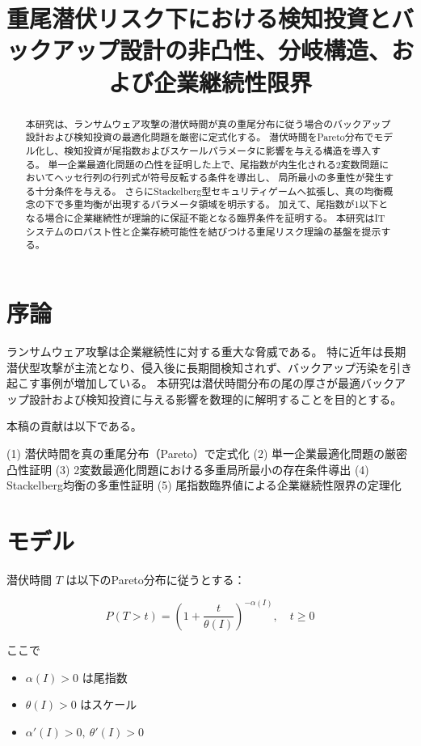 \documentclass[12pt,a4paper]{article}
\title{重尾潜伏リスク下における検知投資とバックアップ設計の非凸性、分岐構造、および企業継続性限界}
\author{}
\date{}
\begin{document}
\maketitle

\begin{abstract}
本研究は、ランサムウェア攻撃の潜伏時間が真の重尾分布に従う場合のバックアップ設計および検知投資の最適化問題を厳密に定式化する。
潜伏時間をPareto分布でモデル化し、検知投資が尾指数およびスケールパラメータに影響を与える構造を導入する。
単一企業最適化問題の凸性を証明した上で、尾指数が内生化される2変数問題においてヘッセ行列の行列式が符号反転する条件を導出し、
局所最小の多重性が発生する十分条件を与える。
さらにStackelberg型セキュリティゲームへ拡張し、真の均衡概念の下で多重均衡が出現するパラメータ領域を明示する。
加えて、尾指数が1以下となる場合に企業継続性が理論的に保証不能となる臨界条件を証明する。
本研究はITシステムのロバスト性と企業存続可能性を結びつける重尾リスク理論の基盤を提示する。
\end{abstract}

\section{序論}

ランサムウェア攻撃は企業継続性に対する重大な脅威である。
特に近年は長期潜伏型攻撃が主流となり、侵入後に長期間検知されず、バックアップ汚染を引き起こす事例が増加している。
本研究は潜伏時間分布の尾の厚さが最適バックアップ設計および検知投資に与える影響を数理的に解明することを目的とする。

本稿の貢献は以下である。

(1) 潜伏時間を真の重尾分布（Pareto）で定式化  
(2) 単一企業最適化問題の厳密凸性証明  
(3) 2変数最適化問題における多重局所最小の存在条件導出  
(4) Stackelberg均衡の多重性証明  
(5) 尾指数臨界値による企業継続性限界の定理化  

\section{モデル}

潜伏時間 $T$ は以下のPareto分布に従うとする：

\begin{equation}
P(T>t)=\left(1+\frac{t}{\theta(I)}\right)^{-\alpha(I)}, \quad t\ge 0
\end{equation}

ここで

\begin{itemize}
\item $\alpha(I)>0$ は尾指数
\item $\theta(I)>0$ はスケール
\item $\alpha'(I)>0,\ \theta'(I)>0$
\end{itemize}
\end{document}
